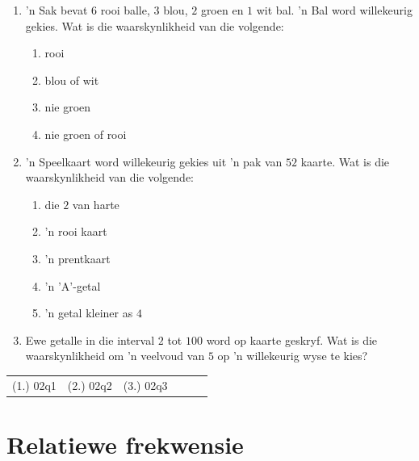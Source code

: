 \begin{exercises}{}
{
  \begin{enumerate}[itemsep=5pt, label=\textbf{\arabic*}.]
  \item 'n Sak bevat $6$ rooi balle, $3$ blou, $2$ groen en $1$ wit
    bal. 'n Bal word willekeurig gekies. Wat is die waarskynlikheid van die volgende:
    \begin{enumerate}[itemsep=5pt, label=\textbf{(\alph*)} ] 
    \item rooi
    \item blou of wit
    \item nie groen
    \item nie groen of rooi
    \end{enumerate}
  \item 'n Speelkaart word willekeurig gekies uit 'n pak van $52$ kaarte. Wat is die waarskynlikheid van die volgende:
    \begin{enumerate}[itemsep=5pt, label=\textbf{(\alph*)} ] 

    \item die $2$ van harte
    \item 'n rooi kaart
    \item 'n prentkaart
    \item 'n 'A'-getal
    \item 'n getal kleiner as $4$
    \end{enumerate}

  \item Ewe getalle in die interval $2$ tot $100$ word op kaarte geskryf. Wat is
    die waarskynlikheid om 'n veelvoud van $5$ op 'n willekeurig wyse te kies?
  \end{enumerate}

\par \practiceinfo
\par \begin{tabular}[h]{cccccc}
(1.)	02q1	&
(2.)	02q2	&
(3.)	02q3	&
\end{tabular}
}
\end{exercises}

\section{Relatiewe frekwensie}


